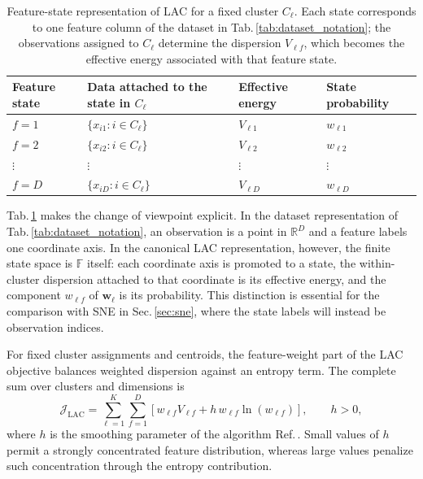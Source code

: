 \documentclass[11pt,a4paper]{article}
\theoremstyle{definition}
\theoremstyle{plain}
\begin{document}
\begin{table}[htbp]
\centering
\begingroup
\renewcommand{\arraystretch}{1.45}
\setlength{\tabcolsep}{8pt}
\caption{Feature-state representation of LAC for a fixed cluster $C_\ell$. Each state corresponds to one feature column of the dataset in Tab.\,\ref{tab:dataset_notation}; the observations assigned to $C_\ell$ determine the dispersion $V_{\ell f}$, which becomes the effective energy associated with that feature state.}
\label{tab:lac_feature_space}
\begin{tabularx}{\textwidth}{>{\centering\arraybackslash}p{} >{\raggedright\arraybackslash}X >{\centering\arraybackslash}p{} >{\centering\arraybackslash}p{}}
\toprule
\textbf{Feature state} & \textbf{Data attached to the state in $C_\ell$} & \textbf{Effective energy} & \textbf{State probability}\\
\midrule
$f=1$ & $\{x_{i1}:i\in C_\ell\}$ & $V_{\ell1}$ & $w_{\ell1}$\\
$f=2$ & $\{x_{i2}:i\in C_\ell\}$ & $V_{\ell2}$ & $w_{\ell2}$\\
$\vdots$ & $\vdots$ & $\vdots$ & $\vdots$\\
$f=D$ & $\{x_{iD}:i\in C_\ell\}$ & $V_{\ell D}$ & $w_{\ell D}$\\
\bottomrule
\end{tabularx}
\endgroup
\end{table}

Tab.\,\ref{tab:lac_feature_space} makes the change of viewpoint explicit. In the dataset representation of Tab.\,\ref{tab:dataset_notation}, an observation is a point in $\mathbb{R}^D$ and a feature labels one coordinate axis. In the canonical LAC representation, however, the finite state space is $\mathbb{F}$ itself: each coordinate axis is promoted to a state, the within-cluster dispersion attached to that coordinate is its effective energy, and the component $w_{\ell f}$ of $\bm{w}_\ell$ is its probability. This distinction is essential for the comparison with SNE in Sec.\,\ref{sec:sne}, where the state labels will instead be observation indices.

For fixed cluster assignments and centroids, the feature-weight part of the LAC objective balances weighted dispersion against an entropy term. The complete sum over clusters and dimensions is
\begin{equation}
    \mathcal{J}_{\mathrm{LAC}}
    =\sum_{\ell=1}^{K}\sum_{f=1}^{D}
      \left[
      w_{\ell f}V_{\ell f}
      +h\,w_{\ell f}\ln\left(w_{\ell f}\right)
      \right],
    \qquad h>0,
    \label{eq:lac_objective}
\end{equation}
where $h$ is the smoothing parameter of the algorithm Ref.\,\cite{domeniconi2007lac}. Small values of $h$ permit a strongly concentrated feature distribution, whereas large values penalize such concentration through the entropy contribution.
\end{document}
